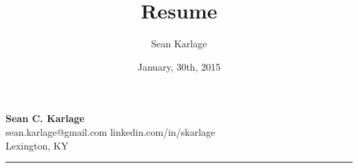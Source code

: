 \documentclass[11pt]{article}
\begin{document}
\title{Resume}            %
\author{Sean Karlage}    %
\date{January, 30th, 2015}    %
\thispagestyle{empty}
\pagestyle{empty}

\begin{center}
    {\LARGE\textbf{Sean C. Karlage}} \\
    sean.karlage@gmail.com \hspace{0.75cm} linkedin.com/in/skarlage \\
    Lexington, KY \vspace{1.0mm}\hrule
\end{center}

\vspace{0.05in}\noindent
\end{document}
